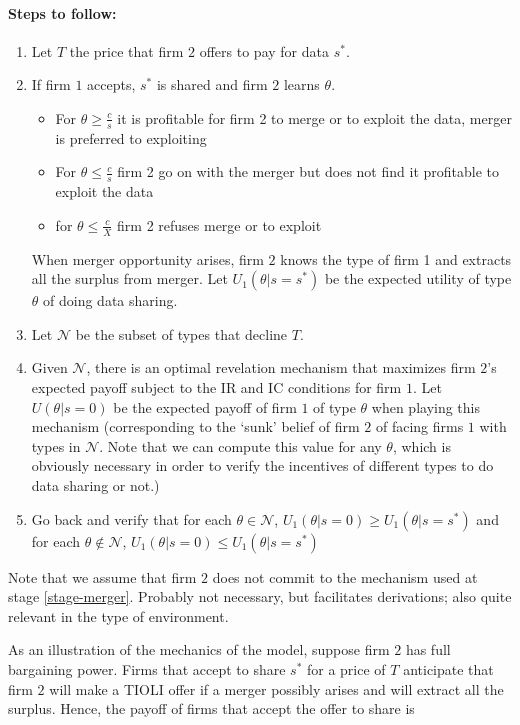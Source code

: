 \documentclass[a4paper]{article}
\newcommand{\N}{\mathcal N}
\renewcommand{\t}{\theta}
\begin{document}
\paragraph{Steps to follow:}
\begin{enumerate}[(1)]\setlength\itemsep{0em}
  \item Let $T$ the price that firm $2$ offers to pay for data $s^*$.
  \item If firm $1$ accepts, $s^*$ is shared and firm $2$ learns $\t$. 
  \begin{itemize}
      \item For $\t \geq \frac{c}{s}$ it is profitable for firm 2 to merge or to exploit the data, merger is preferred to exploiting
      \item For $\t \leq \frac{c}{s}$ firm 2 go on with the merger but does not find it profitable to exploit the data
      \item for $\t \leq \frac{c}{X}$ firm 2 refuses merge or to exploit
  \end{itemize}  
  When merger opportunity arises, firm $2$ knows the type of firm 1 and extracts all the surplus from merger. Let $U_1(\t|s=s^*)$ be the expected utility of type $\t$ of doing data sharing.
  \item Let $\N$ be the subset of types that decline $T$.
  \item\label{stage-merger} Given $\N$, there is an optimal revelation mechanism that maximizes firm $2$'s expected payoff subject to the IR and IC conditions for firm $1$. Let $U(\t|s=0)$ be the expected payoff of firm $1$ of type $\t$ when playing this mechanism (corresponding to the `sunk' belief of firm $2$ of facing firms $1$ with types in $\N$. Note that we can compute this value for any $\t$, which is obviously necessary in order to verify the incentives of different types to do data sharing or not.)
  \item Go back and verify that for each $\t\in \N$, $U_1(\t|s=0)\geq U_1(\t|s=s^*)$ and for each $\t\notin \N$, $U_1(\t|s=0)\leq U_1(\t|s=s^*)$
\end{enumerate}
%
Note that we assume that firm $2$ does not commit to the mechanism used at stage \eqref{stage-merger}. Probably not necessary, but facilitates derivations; also quite relevant in the \cite{anton2002sale} type of environment.

As an illustration of the mechanics of the model, suppose firm $2$ has full bargaining power. Firms that accept to share $s^*$ for a price of $T$ anticipate that firm $2$ will make a TIOLI offer if a merger possibly arises and will extract all the surplus. Hence, the payoff of firms that accept the offer to share is   
%
\end{document}

